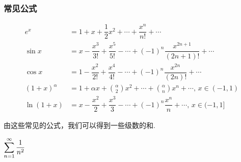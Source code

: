 \subsubsection{常见公式}
\[\begin{aligned}
e^x&=1+x+\dfrac{1}{2}x^2+\cdots+\dfrac{x^n}{n!}+\cdots\\
\sin x&=x-\dfrac{x^3}{3!}+\dfrac{x^5}{5!}-\cdots+(-1)^n\dfrac{x^{2n+1}}{(2n+1)!}+\cdots\\
\cos x&=1-\dfrac{x^2}{2!}+\dfrac{x^4}{4!}-\cdots+(-1)^n\dfrac{x^{2n}}{(2n)!}+\cdots\\
(1+x)^\alpha&=1+\alpha x+\binom{\alpha}{2}x^2+\cdots+\binom{\alpha}{n}x^n+\cdots,\,x\in(-1,1)\\
\ln(1+x)&=x-\dfrac{x^2}{2}+\dfrac{x^3}{3}-\cdots+(-1)^n\dfrac{x^n}{n}+\cdots,\,x\in(-1,1]
\end{aligned}\]
\par 由这些常见的公式，我们可以得到一些级数的和.
\begin{example}
$\displaystyle\sum_{n=1}^{\infty}\dfrac{1}{n^2}$
\end{example}
\begin{analysis}
\end{analysis}